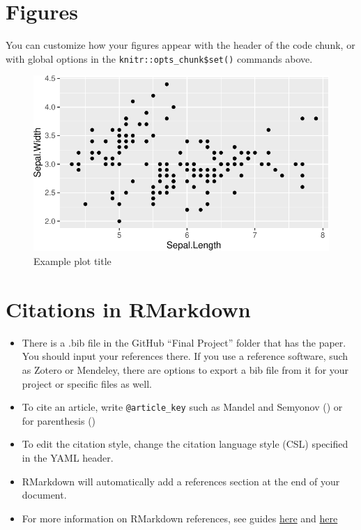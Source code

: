 \documentclass[
  12,
]{article}
\begin{document}
\section{Figures}\label{figures}

You can customize how your figures appear with the header of the code
chunk, or with global options in the \texttt{knitr::opts\_chunk\$set()}
commands above.

\begin{figure}

{\centering \includegraphics{final_project_template_files/figure-latex/unnamed-chunk-1-1} 

}

\caption{Example plot title}\label{fig:unnamed-chunk-1}
\end{figure}

\section{Citations in RMarkdown}\label{citations-in-rmarkdown}

\begin{itemize}
\item
  There is a .bib file in the GitHub ``Final Project'' folder that has
  the paper. You should input your references there. If you use a
  reference software, such as Zotero or Mendeley, there are options to
  export a bib file from it for your project or specific files as well.
\item
  To cite an article, write \texttt{@article\_key} such as Mandel and
  Semyonov () or for parenthesis
  ()
\item
  To edit the citation style, change the citation language style (CSL)
  specified in the YAML header.
\item
  RMarkdown will automatically add a references section at the end of
  your document.
\item
  For more information on RMarkdown references, see guides
  \href{https://bookdown.org/yihui/bookdown/citations.html}{here} and
  \href{https://bookdown.org/yihui/rmarkdown-cookbook/bibliography.html}{here}
\end{itemize}
\end{document}
